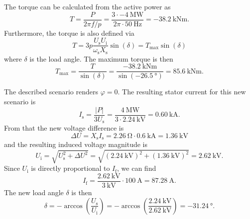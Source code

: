 \begin{solutionblock}
    The torque can be calculated from the active power as
    $$T = \frac{P}{2\pi f/p} = \frac{3\cdot\SI{-4}{\mega\watt}}{2\pi \cdot \SI{50}{\hertz}} = \SI{-38.2}{\kilo\newton\meter}.$$
    Furthermore, the torque is also defined via 
    $$
    T = 3 p \frac{U_\mathrm{s}U_\mathrm{i}}{\omega_\mathrm{s} X_\mathrm{s}}\sin(\delta) = T_\mathrm{max} \sin(\delta)
    $$ 
    where $\delta$ is the load angle. The maximum torque is then 
    $$
    T_\mathrm{max} = \frac{T}{\sin(\delta)} = \frac{\SI{-38.2}{\kilo\newton\meter}}{\sin(\SI{-26.5}{\degree})} = \SI{85.6}{\kilo\newton\meter}.
    $$
\end{solutionblock}


\begin{solutionblock}
    The described scenario renders $\varphi=0$. The resulting stator current for this new scenario is
    $$
    I_\mathrm{s} = \frac{|P|}{3 U_\mathrm{s}} = \frac{\SI{4}{\mega\watt}}{3 \cdot \SI{2.24}{\kilo\volt}} = \SI{0.60}{\kilo\ampere}.$$
    From that the new voltage difference is
    $$
    \Delta U = X_\mathrm{s} I_\mathrm{s} = \SI{2.26}{\ohm} \cdot \SI{0.6}{\kilo\ampere} = \SI{1.36}{\kilo\volt}
    $$
    and the resulting induced voltage magnitude is
    $$
    U_\mathrm{i} = \sqrt{U_\mathrm{s}^2 + \Delta U^2} = \sqrt{(\SI{2.24}{\kilo\volt})^2 + (\SI{1.36}{\kilo\volt})^2} = \SI{2.62}{\kilo\volt}.
    $$
    Since $U_\mathrm{i}$ is directly proportional to $I_\mathrm{f}$, we can find
    $$
    I_\mathrm{f} = \frac{\SI{2.62}{\kilo\volt}}{\SI{3}{\kilo\volt}} \cdot\SI{100}{\ampere} = \SI{87.28}{\ampere}.
    $$
    The new load angle $\delta$ is then
    $$
    \delta = -\arccos\left(\frac{U_\mathrm{s}}{U_\mathrm{i}}\right) = -\arccos\left(\frac{\SI{2.24}{\kilo\volt}}{\SI{2.62}{\kilo\volt}}\right) = \SI{-31.24}{\degree}.
    $$
\end{solutionblock}




